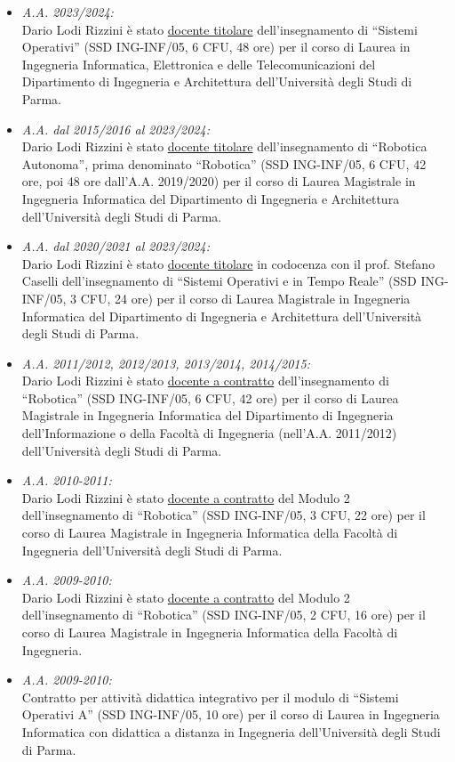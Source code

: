 \documentclass[11pt]{article}
\newcommand{\ITEMDATE}[1]{\item \textit{#1:}\\}
\begin{document}
\begin{itemize}
\ITEMDATE{A.A. 2023/2024}
Dario Lodi Rizzini \`e stato \underline{docente titolare} dell'insegnamento di ``Sistemi Operativi'' (SSD ING-INF/05, 6 CFU, 48 ore) per il corso di Laurea in Ingegneria Informatica, Elettronica e delle Telecomunicazioni del Dipartimento di Ingegneria e Architettura 
dell'Universit\`a degli Studi di Parma. 

\ITEMDATE{A.A. dal 2015/2016 al 2023/2024}
Dario Lodi Rizzini \`e stato \underline{docente titolare} dell'insegnamento di ``Robotica Autonoma'', prima denominato ``Robotica'' (SSD ING-INF/05, 6 CFU, 42 ore, poi 48 ore dall'A.A. 2019/2020)
per il corso di Laurea Magistrale in Ingegneria Informatica del Dipartimento di Ingegneria e Architettura 
dell'Universit\`a degli Studi di Parma. 

\ITEMDATE{A.A. dal 2020/2021 al 2023/2024}
Dario Lodi Rizzini \`e stato \underline{docente titolare} in codocenza con il prof. Stefano Caselli dell'insegnamento di ``Sistemi Operativi e in Tempo Reale'' (SSD ING-INF/05, 3 CFU, 24 ore)
per il corso di Laurea Magistrale in Ingegneria Informatica del Dipartimento di Ingegneria e Architettura 
dell'Universit\`a degli Studi di Parma.

\ITEMDATE{A.A. 2011/2012, 2012/2013, 2013/2014, 2014/2015}
Dario Lodi Rizzini \`e stato \underline{docente a contratto} dell'insegnamento di ``Robotica'' (SSD ING-INF/05, 6 CFU, 42 ore)
per il corso di Laurea Magistrale in Ingegneria Informatica del Dipartimento di Ingegneria dell'Informazione 
o della Facolt\`a di Ingegneria (nell'A.A. 2011/2012)
dell'Universit\`a degli Studi di Parma.


\ITEMDATE{A.A. 2010-2011}
Dario Lodi Rizzini \`e stato \underline{docente a contratto} del Modulo 2 dell'insegnamento di ``Robotica'' 
(SSD ING-INF/05, 3 CFU, 22 ore) per il corso di Laurea Magistrale in Ingegneria Informatica 
della Facolt\`a di Ingegneria dell'Universit\`a degli Studi di Parma.

\ITEMDATE{A.A. 2009-2010}
Dario Lodi Rizzini \`e stato \underline{docente a contratto} del Modulo 2 dell'insegnamento di ``Robotica'' 
(SSD ING-INF/05, 2 CFU, 16 ore) per il corso di Laurea Magistrale in Ingegneria Informatica della Facolt\`a di Ingegneria.

\ITEMDATE{A.A. 2009-2010}
Contratto per attivit\`a didattica integrativo per il modulo di
``Sistemi Operativi A'' (SSD ING-INF/05, 10 ore) per il corso di Laurea in Ingegneria Informatica con didattica a 
distanza in Ingegneria dell'Universit\`a degli Studi di Parma.
\end{itemize}
\end{document}
